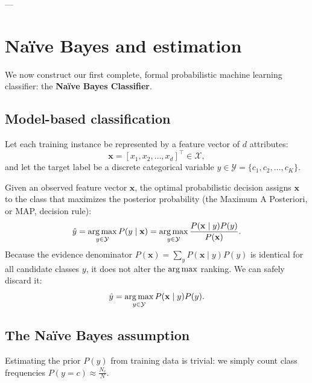 ---

\section{Naïve Bayes and estimation}
\label{sec:naive_bayes_classifier}

We now construct our first complete, formal probabilistic machine learning classifier: the \textbf{Naïve Bayes Classifier}.

\subsection{Model-based classification}
\label{sec:naive_bayes_formulation}

Let each training instance be represented by a feature vector of $d$ attributes:
\begin{equation}
\mathbf{x} = [x_1, x_2, \dots, x_d]^\top \in \mathcal{X},
\end{equation}
and let the target label be a discrete categorical variable $y \in \mathcal{Y} = \{c_1, c_2, \dots, c_K\}$.

Given an observed feature vector $\mathbf{x}$, the optimal probabilistic decision assigns $\mathbf{x}$ to the class that maximizes the posterior probability (the Maximum A Posteriori, or MAP, decision rule):
\begin{equation}
\hat{y} = \operatorname*{arg\,max}_{y \in \mathcal{Y}} P(y \mid \mathbf{x}) = \operatorname*{arg\,max}_{y \in \mathcal{Y}} \frac{P(\mathbf{x} \mid y) P(y)}{P(\mathbf{x})}.
\label{eq:map_decision_rule}
\end{equation}
Because the evidence denominator $P(\mathbf{x}) = \sum_y P(\mathbf{x} \mid y)P(y)$ is identical for all candidate classes $y$, it does not alter the $\operatorname*{arg\,max}$ ranking. We can safely discard it:
\begin{equation}
\hat{y} = \operatorname*{arg\,max}_{y \in \mathcal{Y}} P(\mathbf{x} \mid y) P(y).
\label{eq:unnormalized_map_rule}
\end{equation}

\subsection{The Naïve Bayes assumption}
\label{sec:naive_independence_assumption}

Estimating the prior $P(y)$ from training data is trivial: we simply count class frequencies $P(y = c) \approx \frac{N_c}{N}$. 

